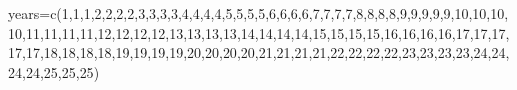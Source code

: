 \documentclass[
  letterpaper,
  DIV=11,
  numbers=noendperiod]{scrreprt}
\newenvironment{Shaded}{\begin{snugshade}}{\end{snugshade}}
\newcommand{\DecValTok}[1]{\textcolor[rgb]{0.68,0.00,0.00}{#1}}
\newcommand{\FunctionTok}[1]{\textcolor[rgb]{0.28,0.35,0.67}{#1}}
\newcommand{\NormalTok}[1]{\textcolor[rgb]{0.00,0.23,0.31}{#1}}
\newcommand{\OtherTok}[1]{\textcolor[rgb]{0.00,0.23,0.31}{#1}}
\begin{document}
\begin{Shaded}
\begin{Highlighting}[]
\NormalTok{years}\OtherTok{=}\FunctionTok{c}\NormalTok{(}\DecValTok{1}\NormalTok{,}\DecValTok{1}\NormalTok{,}\DecValTok{1}\NormalTok{,}\DecValTok{2}\NormalTok{,}\DecValTok{2}\NormalTok{,}\DecValTok{2}\NormalTok{,}\DecValTok{2}\NormalTok{,}\DecValTok{3}\NormalTok{,}\DecValTok{3}\NormalTok{,}\DecValTok{3}\NormalTok{,}\DecValTok{3}\NormalTok{,}\DecValTok{4}\NormalTok{,}\DecValTok{4}\NormalTok{,}\DecValTok{4}\NormalTok{,}\DecValTok{4}\NormalTok{,}\DecValTok{5}\NormalTok{,}\DecValTok{5}\NormalTok{,}\DecValTok{5}\NormalTok{,}\DecValTok{5}\NormalTok{,}\DecValTok{6}\NormalTok{,}\DecValTok{6}\NormalTok{,}\DecValTok{6}\NormalTok{,}\DecValTok{6}\NormalTok{,}\DecValTok{7}\NormalTok{,}\DecValTok{7}\NormalTok{,}\DecValTok{7}\NormalTok{,}\DecValTok{7}\NormalTok{,}\DecValTok{8}\NormalTok{,}\DecValTok{8}\NormalTok{,}\DecValTok{8}\NormalTok{,}\DecValTok{8}\NormalTok{,}\DecValTok{9}\NormalTok{,}\DecValTok{9}\NormalTok{,}\DecValTok{9}\NormalTok{,}\DecValTok{9}\NormalTok{,}\DecValTok{9}\NormalTok{,}\DecValTok{10}\NormalTok{,}\DecValTok{10}\NormalTok{,}\DecValTok{10}\NormalTok{,}\DecValTok{10}\NormalTok{,}\DecValTok{11}\NormalTok{,}\DecValTok{11}\NormalTok{,}\DecValTok{11}\NormalTok{,}\DecValTok{11}\NormalTok{,}\DecValTok{12}\NormalTok{,}\DecValTok{12}\NormalTok{,}\DecValTok{12}\NormalTok{,}\DecValTok{12}\NormalTok{,}\DecValTok{13}\NormalTok{,}\DecValTok{13}\NormalTok{,}\DecValTok{13}\NormalTok{,}\DecValTok{13}\NormalTok{,}\DecValTok{14}\NormalTok{,}\DecValTok{14}\NormalTok{,}\DecValTok{14}\NormalTok{,}\DecValTok{14}\NormalTok{,}\DecValTok{15}\NormalTok{,}\DecValTok{15}\NormalTok{,}\DecValTok{15}\NormalTok{,}\DecValTok{15}\NormalTok{,}\DecValTok{16}\NormalTok{,}\DecValTok{16}\NormalTok{,}\DecValTok{16}\NormalTok{,}\DecValTok{16}\NormalTok{,}\DecValTok{17}\NormalTok{,}\DecValTok{17}\NormalTok{,}\DecValTok{17}\NormalTok{,}\DecValTok{17}\NormalTok{,}\DecValTok{17}\NormalTok{,}\DecValTok{18}\NormalTok{,}\DecValTok{18}\NormalTok{,}\DecValTok{18}\NormalTok{,}\DecValTok{18}\NormalTok{,}\DecValTok{19}\NormalTok{,}\DecValTok{19}\NormalTok{,}\DecValTok{19}\NormalTok{,}\DecValTok{19}\NormalTok{,}\DecValTok{20}\NormalTok{,}\DecValTok{20}\NormalTok{,}\DecValTok{20}\NormalTok{,}\DecValTok{20}\NormalTok{,}\DecValTok{21}\NormalTok{,}\DecValTok{21}\NormalTok{,}\DecValTok{21}\NormalTok{,}\DecValTok{21}\NormalTok{,}\DecValTok{22}\NormalTok{,}\DecValTok{22}\NormalTok{,}\DecValTok{22}\NormalTok{,}\DecValTok{22}\NormalTok{,}\DecValTok{23}\NormalTok{,}\DecValTok{23}\NormalTok{,}\DecValTok{23}\NormalTok{,}\DecValTok{23}\NormalTok{,}\DecValTok{24}\NormalTok{,}\DecValTok{24}\NormalTok{,}\DecValTok{24}\NormalTok{,}\DecValTok{24}\NormalTok{,}\DecValTok{25}\NormalTok{,}\DecValTok{25}\NormalTok{,}\DecValTok{25}\NormalTok{)}


\end{Highlighting}
\end{Shaded}
\end{document}
